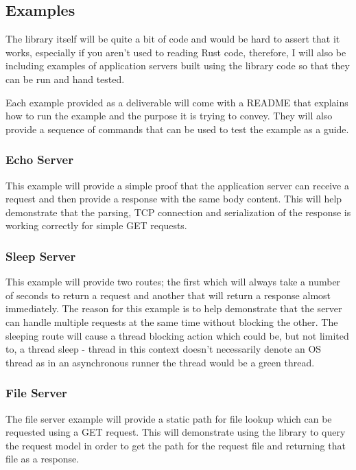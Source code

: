 \documentclass[12pt, a4paper]{article}
\begin{document}
\subsection{Examples}

The library itself will be quite a bit of code and would be hard to assert that it works, especially
if you aren't used to reading Rust code, therefore, I will also be including examples of application
servers built using the library code so that they can be run and hand tested.

Each example provided as a deliverable will come with a README that explains how to run the example
and the purpose it is trying to convey. They will also provide a sequence of commands that can be
used to test the example as a guide.

\subsubsection{Echo Server}

This example will provide a simple proof that the application server can receive a request and then
provide a response with the same body content. This will help demonstrate that the parsing, TCP
connection and serialization of the response is working correctly for simple GET requests.

\subsubsection{Sleep Server}

This example will provide two routes; the first which will always take a number of seconds to return
a request and another that will return a response almost immediately. The reason for this example is
to help demonstrate that the server can handle multiple requests at the same time without blocking
the other. The sleeping route will cause a thread blocking action which could be, but not limited to,
a thread sleep - thread in this context doesn't necessarily denote an OS thread as in an asynchronous
runner the thread would be a green thread.

\subsubsection{File Server}

The file server example will provide a static path for file lookup which can be requested using a
GET request. This will demonstrate using the library to query the request model in order to get
the path for the request file and returning that file as a response.
\end{document}

